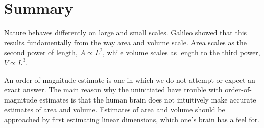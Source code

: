 \section{Summary}

Nature behaves differently on large and small scales.
Galileo showed that this results fundamentally from the way
area and volume scale. Area scales as the second power of
length, $A\propto L^2$, while volume scales as length to the
third power, $V\propto L^3$.

An order of magnitude estimate is one in which we do not
attempt or expect an exact answer. The main reason why the
uninitiated have trouble with order-of-magnitude estimates
is that the human brain does not intuitively make accurate
estimates of area and volume. Estimates of area and volume
should be approached by first estimating linear dimensions,
which one's brain has a feel for.


\divider
\vspace{2mm}

\startexercises

